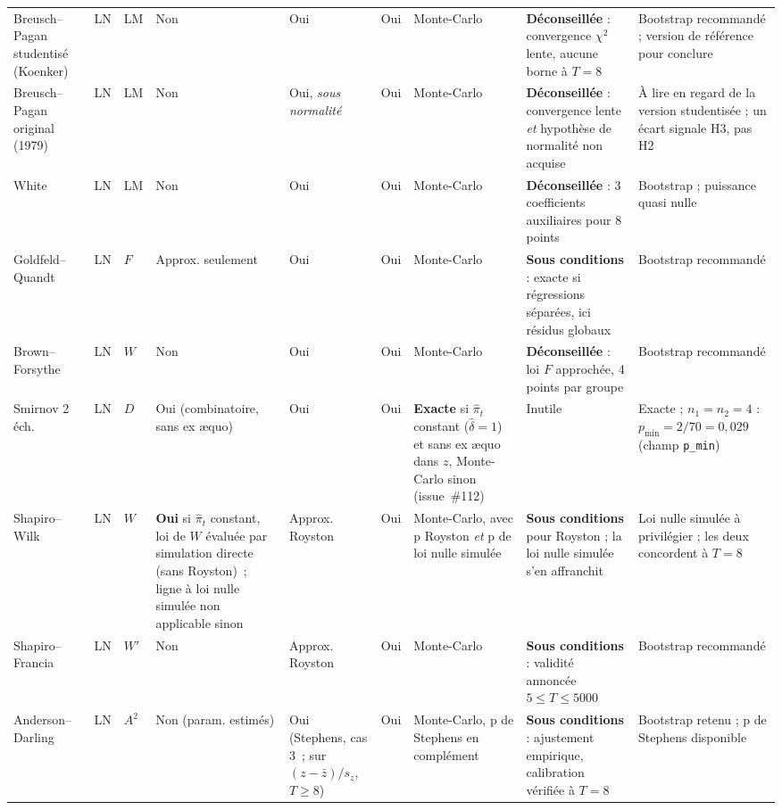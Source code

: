 \documentclass[a4paper,11pt]{article}
\newcommand{\code}[1]{\texttt{\small #1}}
\begin{document}
\begin{landscape}
\begin{center}
\begin{longtable}{@{}p{2.9cm}p{1.5cm}p{1.1cm}p{1.3cm}p{1.3cm}p{1.3cm}p{2.7cm}p{4.7cm}p{4.1cm}@{}}
Breusch--Pagan studentisé (Koenker) & LN & LM & Non & Oui & Oui & Monte-Carlo &
\textbf{Déconseillée} : convergence $\chi^2$ lente, aucune borne à $T=8$ &
Bootstrap recommandé ; version de référence pour conclure \\

Breusch--Pagan original (1979) & LN & LM & Non & Oui, \emph{sous normalité} & Oui & Monte-Carlo &
\textbf{Déconseillée} : convergence lente \emph{et} hypothèse de normalité non acquise &
À lire en regard de la version studentisée ; un écart signale H3, pas H2 \\

White & LN & LM & Non & Oui & Oui & Monte-Carlo &
\textbf{Déconseillée} : 3 coefficients auxiliaires pour 8 points &
Bootstrap ; puissance quasi nulle \\

Goldfeld--Quandt & LN & $F$ & Approx. seulement & Oui & Oui & Monte-Carlo &
\textbf{Sous conditions} : exacte si régressions séparées, ici résidus globaux &
Bootstrap recommandé \\

Brown--Forsythe & LN & $W$ & Non & Oui & Oui & Monte-Carlo &
\textbf{Déconseillée} : loi $F$ approchée, 4 points par groupe &
Bootstrap recommandé \\

Smirnov 2 éch. & LN & $D$ & Oui (combinatoire, sans ex \ae quo) & Oui & Oui & \textbf{Exacte} si
$\hat\pi_t$ constant ($\hat\delta = 1$) et sans ex \ae quo dans $z$, Monte-Carlo sinon
(issue~\#112) &
Inutile & Exacte ; $n_1=n_2=4$ : $p_{\min}=2/70=0{,}029$ (champ \code{p\_min}) \\

Shapiro--Wilk & LN & $W$ & \textbf{Oui} si $\hat\pi_t$ constant, loi de $W$ évaluée par
simulation directe (sans Royston)~; ligne à loi nulle simulée non applicable sinon
& Approx. Royston & Oui & Monte-Carlo, avec p Royston \emph{et} p de loi nulle simulée &
\textbf{Sous conditions} pour Royston ; la loi nulle simulée s'en affranchit &
Loi nulle simulée à privilégier ; les deux concordent à $T=8$ \\

Shapiro--Francia & LN & $W'$ & Non & Approx. Royston & Oui & Monte-Carlo &
\textbf{Sous conditions} : validité annoncée $5\le T\le 5000$ &
Bootstrap recommandé \\

Anderson--Darling & LN & $A^2$ & Non (param. estimés) & Oui (Stephens, cas 3~; sur
$(z-\bar z)/s_z$, $T \ge 8$) & Oui &
Monte-Carlo, p de Stephens en complément &
\textbf{Sous conditions} : ajustement empirique, calibration vérifiée à $T=8$ &
Bootstrap retenu ; p de Stephens disponible \\


\end{longtable}
\end{center}
\end{landscape}
\end{document}
